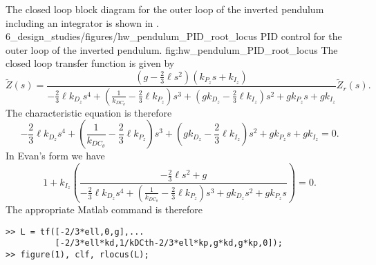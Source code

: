 
The closed loop block diagram for the outer loop of the inverted pendulum including an integrator is shown in .  
	{6_design_studies/figures/hw_pendulum_PID_root_locus}
	{PID control for the outer loop of the inverted pendulum.}
	{fig:hw_pendulum_PID_root_locus}
The closed loop transfer function is given by
{\footnotesize
\[
\tilde{Z}(s) = \frac{(g-\frac{2}{3}\ell s^2 )\left(k_{P_z}s+k_{I_z}\right)}{-\frac{2}{3}\ell k_{D_z} s^4 + \left(\frac{1}{k_{DC_\theta}}-\frac{2}{3} \ell  k_{P_z}\right)s^3 + (g k_{D_z}-\frac{2}{3}\ell  k_{I_z})s^2 + gk_{P_z}s +  g k_{I_z}} \tilde{Z}_r(s).
\]
}
The characteristic equation is therefore
\[
-\frac{2}{3}\ell k_{D_z} s^4 + \left(\frac{1}{k_{DC_\theta}}-\frac{2}{3} \ell  k_{P_z}\right)s^3 + (g k_{D_z}-\frac{2}{3}\ell  k_{I_z})s^2 + gk_{P_z}s +  g k_{I_z} = 0.
\]
In Evan's form we have
\[
1 + k_{I_z}\left(\frac{-\frac{2}{3}\ell s^2+g}{-\frac{2}{3}\ell k_{D_z} s^4 + \left(\frac{1}{k_{DC_\theta}}-\frac{2}{3} \ell  k_{P_z}\right)s^3 + g k_{D_z}s^2 + gk_{P_z}s}\right) = 0.
\]
The appropriate Matlab command is therefore
\begin{lstlisting}
>> L = tf([-2/3*ell,0,g],...
          [-2/3*ell*kd,1/kDCth-2/3*ell*kp,g*kd,g*kp,0]);
>> figure(1), clf, rlocus(L);
\end{lstlisting}

